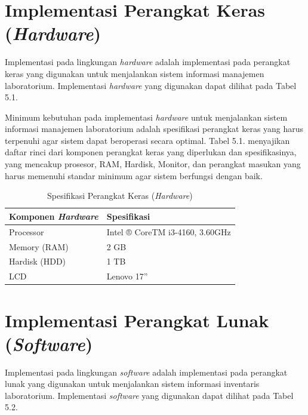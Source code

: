 \section{Implementasi Perangkat Keras (\textit{Hardware})}
Implementasi pada lingkungan \textit{hardware} adalah implementasi pada perangkat keras yang digunakan untuk menjalankan sistem informasi manajemen laboratorium. Implementasi \textit{hardware} yang digunakan dapat dilihat pada Tabel 5.1.

Minimum kebutuhan pada implementasi \textit{hardware} untuk menjalankan sistem informasi manajemen laboratorium adalah spesifikasi perangkat keras yang harus terpenuhi agar sistem dapat beroperasi secara optimal. Tabel 5.1. menyajikan daftar rinci dari komponen perangkat keras yang diperlukan dan spesifikasinya, yang mencakup prosesor, RAM, Hardisk, Monitor, dan perangkat masukan yang harus memenuhi standar minimum agar sistem berfungsi dengan baik.

\begin{table}[h]
	\centering
	\caption{Spesifikasi Perangkat Keras (\textit{Hardware})}
	\begin{tabular}{|l|l|}
		\hline
		\textbf{Komponen \textit{Hardware}} & \textbf{Spesifikasi}            \\ \hline
		Processor                           & Intel ® CoreTM i3-4160, 3.60GHz \\ \hline
		Memory (RAM)                        & 2 GB                            \\ \hline
		Hardisk (HDD)                       & 1 TB                            \\ \hline
		LCD                                 & Lenovo 17”                      \\ \hline
	\end{tabular}
\end{table}
\vspace{1cm}

\section{Implementasi Perangkat Lunak (\textit{Software})}
Implementasi pada lingkungan \textit{software} adalah implementasi pada perangkat lunak yang digunakan untuk menjalankan sistem informasi inventaris laboratorium. Implementasi \textit{software} yang digunakan dapat dilihat pada Tabel 5.2.

